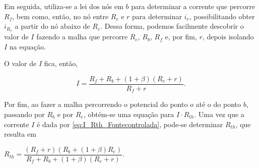 \documentclass{article}
\numberwithin{equation}{section}
\newlength\Colsep
\let\dfr\dfrac
\begin{document}
\noindent\begin{minipage}{0.95\textwidth}
\begin{minipage}[c][8cm][c]{\dimexpr0.65\textwidth-0.5\Colsep\relax}
    \begin{center}
    \end{center}
\end{minipage} \hfill
\begin{minipage}[c][8cm][c]{\dimexpr0.35\textwidth-0.5\Colsep\relax}
    Em seguida, utiliza-se a lei dos nós em $b$ para determinar a corrente que percorre $R_{f}$, bem como, então, no nó entre $R_c$ e $r$ para determinar $i_r$, possibilitando obter $i_{R_e}$ a partir do nó abaixo de $R_e$. Dessa forma, podemos facilmente descobrir o valor de $I$ fazendo a malha que percorre $R_e$, $R_b$, $R_{f}$ e, por fim, $r$, depois isolando $I$ na equação.
\end{minipage}
\end{minipage}

\noindent O valor de $I$ fica, então,

\begin{equation}
    I = \dfr{R_{f} + R_b + (1+\beta)(R_e + r)}{R_{f}+r}. \label{eq:I_Rth_Fontecontrolada}
\end{equation}

\noindent Por fim, ao fazer a malha percorrendo o potencial do ponto $o$ até o do ponto $b$, passando por $R_b$ e por $R_e$, obtém-se uma equação para $I\cdot R_{th}$. Uma vez que a corrente $I$ é dada por \eqref{eq:I_Rth_Fontecontrolada}, pode-se determinar $R_{th}$, que resulta em

\begin{center}
    $R_{th} = \dfr{(R_{f}+r)(R_b + (1+\beta)R_e)}{R_{f}+R_b+(1+\beta)(R_e+r)}$.
\end{center}
\end{document}
